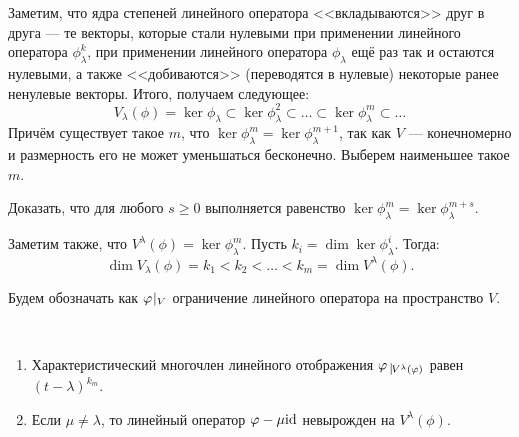 \vspace{0.2cm}
Заметим, что ядра степеней линейного оператора <<вкладываются>> друг в друга --- те векторы, которые стали нулевыми при применении линейного оператора $\phi^k_\lambda$, при применении линейного оператора $\phi_\lambda$ ещё раз так и остаются нулевыми, а также <<добиваются>> (переводятся в нулевые) некоторые ранее ненулевые векторы. Итого, получаем следующее:
\[
V_\lambda(\phi) = \ker\phi_\lambda \subset \ker\phi^2_\lambda \subset \ldots \subset \ker\phi^m_\lambda 
\subset \ldots
\]
Причём существует такое $m$, что $\ker\phi^m_\lambda = \ker\phi^{m + 1}_\lambda$, так как $V$ --- конечномерно и размерность его не может уменьшаться бесконечно. Выберем наименьшее такое $m$.
\begin{Task}
	Доказать, что для любого $s \geqslant 0$ выполняется равенство $\ker\phi^m_\lambda = \ker\phi^{m + s}_\lambda.$
\end{Task}
Заметим также, что $V^{\lambda}(\phi) = \ker\phi^m_\lambda.$ Пусть $k_i = \dim\ker\phi^i_\lambda$.
Тогда:
 $$ \dim{V_{\lambda}(\phi)} = k_1 < k_2 < \ldots < k_m =  \dim{V^{\lambda}(\phi)}.
 $$
 
 Будем обозначать как ${\varphi}\negmedspace\mid_{V}$ ограничение линейного оператора на пространство $V$.
 
\begin{Suggestion}\
	\begin{enumerate}
		\item Характеристический многочлен линейного отображения $\phi \; \vline_{V^{\lambda}(\phi)}$ равен $(t - \lambda)^{k_m}$.
		\item Если $\mu \neq \lambda$, то линейный оператор $\varphi - \mu \mathrm{id}$ невырожден на  $V^{\lambda}(\phi)$.
	\end{enumerate}
\end{Suggestion}

